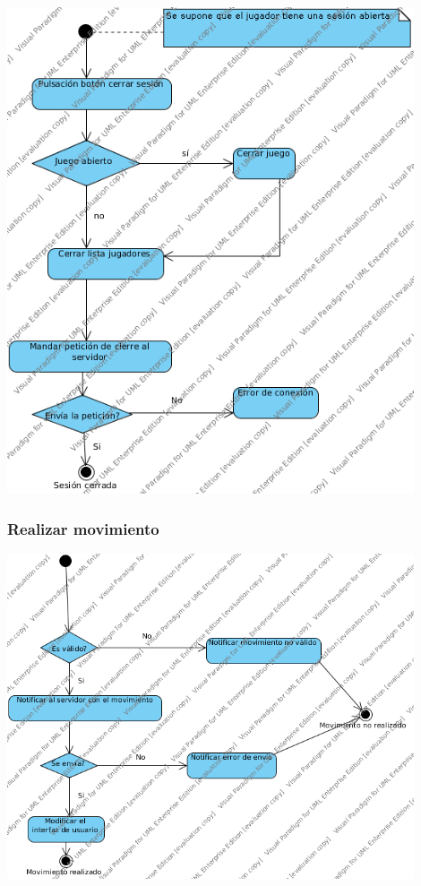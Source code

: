 \documentclass[a4paper,11pt,oneside]{article}
\begin{document}
\includegraphics[width=0.9\textwidth]{img/ms_CerrarSesionCliente.png}\\[1cm]


\subsubsection{Realizar movimiento}

\includegraphics[width=0.9\textwidth]{img/ms_RealizarMovimientoCliente.png}\\[1cm]
\end{document}
